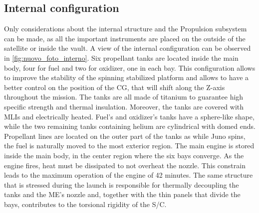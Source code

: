 \subsection{Internal configuration}
\label{subsec:internal_config}

Only considerations about the internal structure and the Propulsion subsystem can be made, as all the important instruments are placed on the outside of the satellite or inside the vault.
A view of the internal configuration can be observed in \autoref{fig:nuovo_foto_interno}. Six propellant tanks are located inside the main body, four for fuel and two for oxidizer, one in each bay.
This configuration allows to improve the stability of the spinning stabilized platform and allows to have a better control on the position of the CG, that will shift along the Z-axis throughout the mission.
The tanks are all made of titanium to guarantee high specific strength and thermal insulation.\cite{LL_early_cruise}
Moreover, the tanks are covered with MLIs and electrically heated. Fuel's and oxidizer's tanks have a sphere-like shape, while the two remaining tanks containing helium are cylindrical with domed ends.
Propellant lines are located on the outer part of the tanks as while Juno spins, the fuel is naturally moved to the most exterior region.
The main engine is stored inside the main body, in the center region where the six bays converge. \cite{Juno_launch} \cite{Leros}
As the engine fires, heat must be dissipated to not overheat the nozzle. This constrain leads to the maximum operation of the engine of 42 minutes.\cite{Leros}
The same structure that is stressed during the launch is responsible for thermally decoupling the tanks and the ME's nozzle and, together with the thin panels that divide the bays, contributes to the torsional rigidity of the S/C.